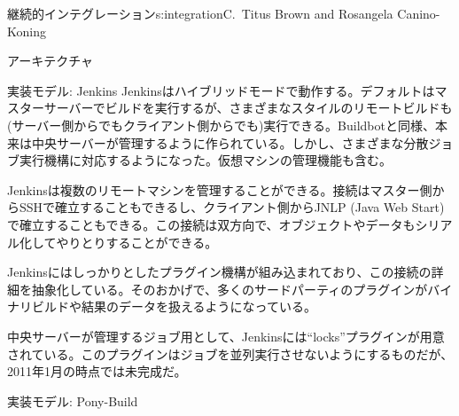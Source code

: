 \begin{aosachapter}{継続的インテグレーション}{s:integration}{C.\ Titus Brown and Rosangela Canino-Koning}
\begin{aosasect1}{アーキテクチャ}
\begin{aosasect2}{実装モデル: Jenkins}
Jenkinsはハイブリッドモードで動作する。デフォルトはマスターサーバーでビルドを実行するが、さまざまなスタイルのリモートビルドも(サーバー側からでもクライアント側からでも)実行できる。Buildbotと同様、本来は中央サーバーが管理するように作られている。しかし、さまざまな分散ジョブ実行機構に対応するようになった。仮想マシンの管理機能も含む。

Jenkinsは複数のリモートマシンを管理することができる。接続はマスター側からSSHで確立することもできるし、クライアント側からJNLP (Java Web Start)で確立することもできる。この接続は双方向で、オブジェクトやデータもシリアル化してやりとりすることができる。

Jenkinsにはしっかりとしたプラグイン機構が組み込まれており、この接続の詳細を抽象化している。そのおかげで、多くのサードパーティのプラグインがバイナリビルドや結果のデータを扱えるようになっている。

中央サーバーが管理するジョブ用として、Jenkinsには``locks''プラグインが用意されている。このプラグインはジョブを並列実行させないようにするものだが、2011年1月の時点では未完成だ。

\end{aosasect2}

\begin{aosasect2}{実装モデル: Pony-Build}



\end{aosasect2}
\end{aosasect1}
\end{aosachapter}
